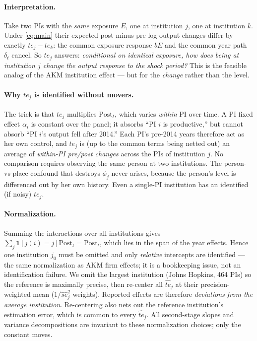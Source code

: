 \documentclass[11pt]{article}
\newcommand{\Post}{\mathrm{Post}}
\begin{document}
\paragraph{Interpretation.}
Take two PIs with the \emph{same} exposure $E$, one at institution $j$, one
at institution $k$. Under \eqref{eq:main} their expected post-minus-pre
log-output changes differ by exactly $te_j - te_k$: the common exposure
response $b E$ and the common year path $\delta_t$ cancel. So $te_j$ answers:
\emph{conditional on identical exposure, how does being at institution $j$
change the output response to the shock period?} This is the feasible analog
of the AKM institution effect --- but for the \emph{change} rather than the
level.

\paragraph{Why $te_j$ is identified without movers.}
The trick is that $te_j$ multiplies $\Post_t$, which varies \emph{within} PI
over time. A PI fixed effect $\alpha_i$ is constant over the panel; it
absorbs ``PI $i$ is productive,'' but cannot absorb ``PI $i$'s output fell
after 2014.'' Each PI's pre-2014 years therefore act as her own control, and
$te_j$ is (up to the common terms being netted out) an average of
\emph{within-PI pre/post changes} across the PIs of institution $j$. No
comparison requires observing the same person at two institutions. The
person-vs-place confound that destroys $\phi_j$ never arises, because the
person's level is differenced out by her own history. Even a single-PI
institution has an identified (if noisy) $te_j$.

\paragraph{Normalization.}
Summing the interactions over all institutions gives
$\sum_j \mathbf{1}[j(i)=j]\Post_t = \Post_t$, which lies in the span of the
year effects. Hence one institution $j_0$ must be omitted and only
\emph{relative} intercepts are identified --- the same normalization as AKM
firm effects; it is a bookkeeping issue, not an identification failure. We
omit the largest institution (Johns Hopkins, 464 PIs) so the reference is
maximally precise, then re-center all $\hat{te}_j$ at their precision-weighted
mean ($1/\hat{se}_j^2$ weights). Reported effects are therefore
\emph{deviations from the average institution}. Re-centering also nets out
the reference institution's estimation error, which is common to every
$\hat{te}_j$. All second-stage slopes and variance decompositions are
invariant to these normalization choices; only the constant moves.
\end{document}
